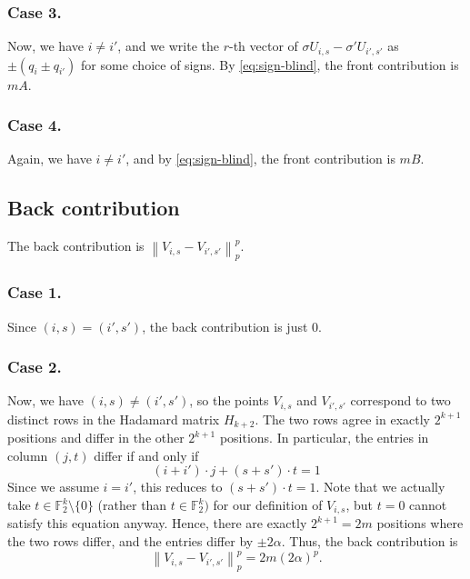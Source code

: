 \documentclass[11pt,reqno]{amsart}
\theoremstyle{plain}
\theoremstyle{definition}
\theoremstyle{remark}
\newcommand{\F}{\mathbb{F}}
\newcommand{\norm}[1]{\left\lVert #1 \right\rVert}
\numberwithin{equation}{section}
\begin{document}
\subsubsection*{Case 3.}
Now, we have $i\neq i'$, and we write the $r$-th vector of $\sigma U_{i,s}-\sigma' U_{i',s'}$ as $\pm (q_i\pm q_{i'})$ for some choice of signs. By \eqref{eq:sign-blind}, the front contribution is $mA$. 

\subsubsection*{Case 4.}
Again, we have $i\neq i'$, and by \eqref{eq:sign-blind}, the front contribution is $mB$.

\subsection{Back contribution}
The back contribution is $\norm{V_{i,s}-V_{i',s'}}_p^p$.

\subsubsection*{Case 1.}
Since $(i,s)=(i',s')$, the back contribution is just 0.

\subsubsection*{Case 2.}
Now, we have $(i,s)\neq (i',s')$, so the points $V_{i,s}$ and $V_{i',s'}$ correspond to two distinct rows in the Hadamard matrix $H_{k+2}$. The two rows agree in exactly $2^{k+1}$ positions and differ in the other $2^{k+1}$ positions. In particular, the entries in column $(j,t)$ differ if and only if
\begin{equation}\label{eq:hadamard-cond}
(i+i')\cdot j+(s+s')\cdot t=1
\end{equation}
Since we assume $i=i'$, this reduces to $(s+s')\cdot t=1$. Note that we actually take $t\in\F_2^k\setminus\{0\}$ (rather than $t\in\F_2^k)$ for our definition of $V_{i,s}$, but $t=0$ cannot satisfy this equation anyway. Hence, there are exactly $2^{k+1}=2m$ positions where the two rows differ, and the entries differ by $\pm 2\alpha$. Thus, the back contribution is
\[\norm{V_{i,s}-V_{i',s'}}_p^p=2m(2\alpha)^p.\]
\end{document}
